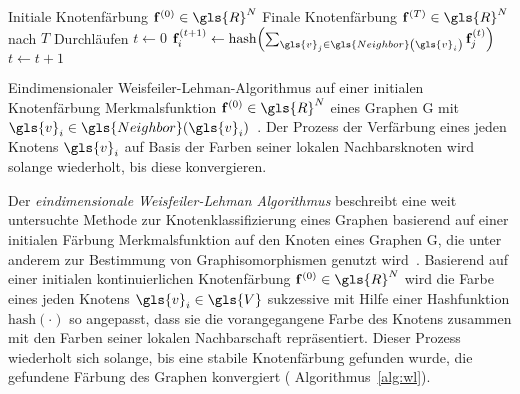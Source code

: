\begin{algorithm}[t]
\centering
\begin{algorithmic}
  \REQUIRE{} Initiale Knotenfärbung $\ve{f}^{\left(0\right)} \in \gls{R}^N$
  \ENSURE{} Finale Knotenfärbung $\ve{f}^{\left(T\right)} \in \gls{R}^N$ nach $T$ Durchläufen
  \STATE{} $t \leftarrow 0$
  \REPEAT{}
      \STATE{} $\ve{f}^{\left(t+1\right)}_i \leftarrow \mathrm{hash}\left(\sum_{\gls{v}_j \in \gls{Neighbor}\left(\gls{v}_i\right)} \ve{f}^{\left(t\right)}_j\right)$
    \ENDFOR{}
    \STATE{} $t \leftarrow t + 1$
\end{algorithmic}
  \caption[Weisfeiler-Lehman]{Eindimensionaler Weisfeiler-Lehman-Algorithmus auf einer initialen Knotenfärbung \bzw{} Merkmalsfunktion $\ve{f}^{\left(0\right)} \in \gls{R}^N$ eines Graphen \gls{G} mit $\gls{v}_i \in \gls{Neighbor}\left(\gls{v}_i\right)$~\cite{wl}. Der Prozess der Verfärbung eines jeden Knotens $\gls{v}_i$ auf Basis der Farben seiner lokalen Nachbarsknoten wird solange wiederholt, bis diese konvergieren.}
\label{alg:wl}
\end{algorithm}

Der \emph{eindimensionale Weis\-fei\-ler-Lehman Algorithmus} beschreibt eine weit untersuchte Methode zur Knotenklassifizierung eines Graphen basierend auf einer initialen Färbung \bzw{} Merkmalsfunktion auf den Knoten eines Graphen \gls{G}, die unter anderem zur Bestimmung von Graphisomorphismen genutzt wird~\cite{douglas}.
Basierend auf einer initialen kontinuierlichen Knotenfärbung $\ve{f}^{\left(0\right)} \in \gls{R}^N$ wird die Farbe eines jeden Knotens $\gls{v}_i \in \gls{V}$ sukzessive mit Hilfe einer Hashfunktion $\mathrm{hash}\left(\cdot\right)$ so angepasst, dass sie die vorangegangene Farbe des Knotens zusammen mit den Farben seiner lokalen Nachbarschaft repräsentiert.
Dieser Prozess wiederholt sich solange, bis eine stabile Knotenfärbung gefunden wurde, \dhe{} die gefundene Färbung des Graphen konvergiert (\vgl{} Algorithmus~\ref{alg:wl}).

